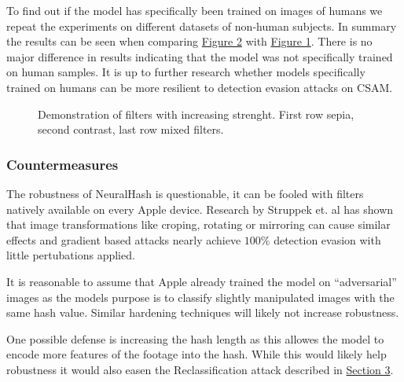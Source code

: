 \documentclass[10pt,twocolumn,letterpaper]{article}
\newcommand{\rref}[1]{\hyperref[ref:#1]{\text{[#1]}}}
\begin{document}
To find out if the model has specifically been trained on images of humans we repeat the experiments on different datasets of non-human subjects. In summary the results can be seen when comparing \hyperref[fig:two]{Figure 2} with \hyperref[fig:one]{Figure 1}. There is no major difference in results indicating that the model was not specifically trained on human samples. It is up to further research whether models specifically trained on humans can be more resilient to detection evasion attacks on CSAM.

\begin{figure}[t]
  \centering
   \caption{Demonstration of filters with increasing strenght. First row sepia, second contrast, last row mixed filters.}
   \label{fig:three}
\end{figure}

\subsubsection{Countermeasures}

The robustness of NeuralHash is questionable, it can be fooled with filters natively available on every Apple device. Research by Struppek et. al \rref{2} has shown that image transformations like croping, rotating or mirroring can cause similar effects and gradient based attacks nearly achieve $100\%$ detection evasion with little pertubations applied. 

It is reasonable to assume that Apple already trained the model on ``adversarial'' images as the models purpose is to classify slightly manipulated images with the same hash value. Similar hardening techniques will likely not increase robustness. 

One possible defense is increasing the hash length \rref{1} as this allowes the model to encode more features of the footage into the hash. While this would likely help robustness it would also easen the Reclassification attack described in \hyperref[sec:reclass]{Section 3}.
\end{document}
